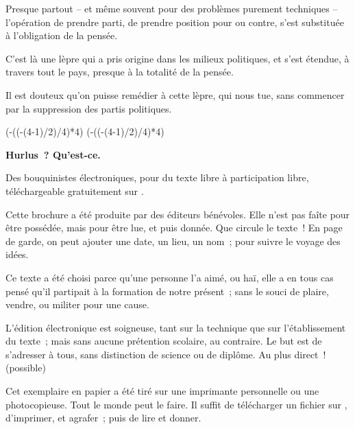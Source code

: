\documentclass[french,twoside]{book} %
\def\truncdiv#1#2{((#1-(#2-1)/2)/#2)}
\def\moduloop#1#2{(#1-\truncdiv{#1}{#2}*#2)}
\def\modulo#1#2{\number\numexpr\moduloop{#1}{#2}\relax}
\begin{document}
Presque partout – et même souvent pour des problèmes purement techniques – l’opération de prendre parti, de prendre position pour ou contre, s’est substituée à l’obligation de la pensée.\par
C’est là une lèpre qui a pris origine dans les milieux politiques, et s’est étendue, à travers tout le pays, presque à la totalité de la pensée.\par
Il est douteux qu’on puisse remédier à cette lèpre, qui nous tue, sans commencer par la suppression des partis politiques.
 


\ifbooklet
  \pagestyle{empty}
  \clearpage
  \ifnum\modulo{\value{page}}{4}=0 \hbox{}\newpage\hbox{}\newpage\fi
  \ifnum\modulo{\value{page}}{4}=1 \hbox{}\newpage\hbox{}\newpage\fi


  \hbox{}\newpage
  \ifodd\value{page}\hbox{}\newpage\fi
  {\centering\color{rubric}\bfseries\noindent\large
    Hurlus ? Qu’est-ce.\par
    \bigskip
  }
  \noindent Des bouquinistes électroniques, pour du texte libre à participation libre,
  téléchargeable gratuitement sur \href{https://hurlus.fr}{}.\par
  \bigskip
  \noindent Cette brochure a été produite par des éditeurs bénévoles.
  Elle n’est pas faîte pour être possédée, mais pour être lue, et puis donnée.
  Que circule le texte !
  En page de garde, on peut ajouter une date, un lieu, un nom ; pour suivre le voyage des idées.
  \par

  Ce texte a été choisi parce qu’une personne l’a aimé,
  ou haï, elle a en tous cas pensé qu’il partipait à la formation de notre présent ;
  sans le souci de plaire, vendre, ou militer pour une cause.
  \par

  L’édition électronique est soigneuse, tant sur la technique
  que sur l’établissement du texte ; mais sans aucune prétention scolaire, au contraire.
  Le but est de s’adresser à tous, sans distinction de science ou de diplôme.
  Au plus direct ! (possible)
  \par

  Cet exemplaire en papier a été tiré sur une imprimante personnelle
   ou une photocopieuse. Tout le monde peut le faire.
  Il suffit de
  télécharger un fichier sur \href{https://hurlus.fr}{},
  d’imprimer, et agrafer ; puis de lire et donner.\par
\end{document}
